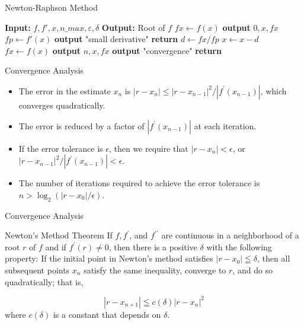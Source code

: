 \documentclass{beamer}
\begin{document}
\begin{frame}[fragile]{Newton-Raphson Method}
  \scriptsize 
\begin{algorithmic}
  \State \textbf{Input:} $f, f', x, n\_max, \varepsilon, \delta$
  \State \textbf{Output:} Root of $f$
  \State $fx \gets f(x)$
  \State \textbf{output} $0, x, fx$
    \State $fp \gets f'(x)$
      \State \textbf{output} "small derivative"
      \State \textbf{return}
    \EndIf
    \State $d \gets fx / fp$
    \State $x \gets x - d$
    \State $fx \gets f(x)$
    \State \textbf{output} $n, x, fx$
      \State \textbf{output} "convergence"
      \State \textbf{return}
    \EndIf
  \EndFor
\EndProcedure
\end{algorithmic}
\end{frame}
\begin{frame}{Convergence Analysis}
  \begin{itemize}
    \item The error in the estimate $x_n$ is $|r-x_n| \leq |r-x_{n-1}|^2/|f^{\prime}(x_{n-1})|$, which converges quadratically.
    \item The error is reduced by a factor of $|f^{\prime}(x_{n-1})|$ at each iteration.
    \item If the error tolerance is $\epsilon$, then we require that $|r-x_n|<\epsilon$, or $|r-x_{n-1}|^2/|f^{\prime}(x_{n-1})|<\epsilon$.
    \item The number of iterations required to achieve the error tolerance is $n>\log_2(|r-x_0|/\epsilon)$.
  \end{itemize}
\end{frame}
\begin{frame}{Convergence Analysis}
  \begin{block}{Newton's Method Theorem}
    If $f, f^{\prime}$, and $f^{\prime \prime}$ are continuous in a neighborhood of a root $r$ of $f$ and if $f^{\prime}(r) \neq 0$, then there is a positive $\delta$ with the following property: If the initial point in Newton's method satisfies $\left|r-x_0\right| \leqq \delta$, then all subsequent points $x_n$ satisfy the same inequality, converge to $r$, and do so quadratically; that is,

$$
\left|r-x_{n+1}\right| \leqq c(\delta)\left|r-x_n\right|^2
$$
where $c(\delta)$ is a constant that depends on $\delta$.
  \end{block}
\end{frame}
\end{document}
